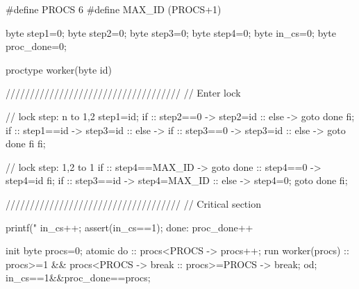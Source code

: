 \vspace{2\baselineskip}
\begin{lstcode}[language=Promela,caption={Promela implementation for verification},label=lst:atomic:promela]
#define PROCS	6
#define MAX_ID	(PROCS+1)

byte step1=0;
byte step2=0;
byte step3=0;
byte step4=0;
byte in_cs=0;
byte proc_done=0;

proctype worker(byte id) {

	////////////////////////////////////
	// Enter lock

    // lock step: n to {1,2}
    step1=id;
    if  
    :: step2==0 -> step2=id
    :: else -> goto done
    fi; 
    if
    :: step1==id -> step3=id
    :: else ->  
		if  
		:: step3==0 -> step3=id
		:: else -> goto done
		fi  
    fi; 

    // lock step: {1,2} to 1
    if
    :: step4==MAX_ID -> goto done
    :: step4==0 -> step4=id
    fi; 
    if  
    :: step3==id -> step4=MAX_ID
    :: else -> step4=0; goto done
    fi; 
	
	////////////////////////////////////
	// Critical section

    printf("%
    in_cs++;
    assert(in_cs==1);
done:
    proc_done++
}

init { 
	byte procs=0;
    atomic{
        do  
        :: procs<PROCS -> procs++; run worker(procs)
        :: procs>=1 && procs<PROCS -> break
        :: procs>=PROCS -> break;
        od; 
    }
    in_cs==1&&proc_done==procs;
}
\end{lstcode}


